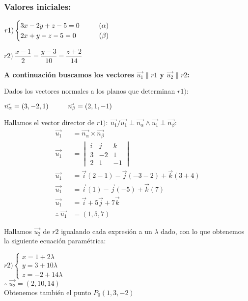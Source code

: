 \subsubsection*{Valores iniciales:}

\begin{multicols}{2}
	$r1)
		\begin{cases}
			3x - 2y + z - 5 = 0 \hspace{1cm} (\alpha) \\
			2x + y - z - 5 = 0  \hfill (\beta)
		\end{cases}$

	$r2) \ \dfrac{x - 1}{2} = \dfrac{y - 3}{10} = \dfrac{z + 2}{14}$
\end{multicols}

\noindent \textbf{A continuación buscamos los vectores $\vec{u_1} \parallel r1$ y $\vec{u_2} \parallel r2$:}

\noindent Dados los vectores normales a los planos que determinan $r1)$:

\begin{center}
	$\vec{n_{\alpha}} = (3, -2, 1) \hspace*{1cm} \vec{n_{\beta}} = (2, 1, -1)$
\end{center}
\vspace{0.5cm}
\noindent Hallamos el vector director de
$r1): \ \vec{u_1} / \vec{u_1} \perp \vec{n_{\alpha}} \land \vec{u_1} \perp \vec{n_{\beta}}$:
\begin{align*}
	\vec{u_1}              & = \vec{n_{\alpha}} \times \vec{n_{\beta}}          \\
	\vec{u_1}              & = \begin{vmatrix}
		                           i & j  & k  \\
		                           3 & -2 & 1  \\
		                           2 & 1  & -1
	                           \end{vmatrix}                                   \\
	\vec{u_1}              & = \vec{i}(2 - 1) - \vec{j}(-3 -2) + \vec{k}(3 + 4) \\
	\vec{u_1}              & = \vec{i}(1) - \vec{j}(-5) + \vec{k}(7)            \\
	\vec{u_1}              & = \vec{i} + 5\vec{j} + 7\vec{k}                    \\
	\therefore \ \vec{u_1} & = \boxed{(1, 5, 7)}
\end{align*}

\noindent Hallamos $\vec{u_2}$ de $r2$ igualando cada expresión a un $\lambda$ dado, con lo que obtenemos la siguiente ecuación paramétrica:

\begin{center}
	$r2)
		\begin{cases}
			x = 1 + 2\lambda  \\
			y = 3 + 10\lambda \\
			z = -2 + 14\lambda
		\end{cases}$ \\
	\vspace{0.3cm}
	\noindent $\therefore \ \boxed{\vec{u_2} = (2, 10, 14)}$  \\
	\vspace{0.3cm}
	Obtenemos también el punto $P_0(1,3,-2)$
\end{center}

